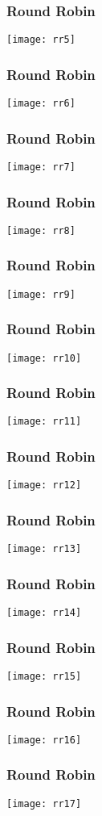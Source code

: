 \begin{frame}
\frametitle{Round Robin}
\texttt{[image: rr5]}
\end{frame}

\begin{frame}
\frametitle{Round Robin}
\texttt{[image: rr6]}
\end{frame}

\begin{frame}
\frametitle{Round Robin}
\texttt{[image: rr7]}
\end{frame}

\begin{frame}
\frametitle{Round Robin}
\texttt{[image: rr8]}
\end{frame}

\begin{frame}
\frametitle{Round Robin}
\texttt{[image: rr9]}
\end{frame}

\begin{frame}
\frametitle{Round Robin}
\texttt{[image: rr10]}
\end{frame}

\begin{frame}
\frametitle{Round Robin}
\texttt{[image: rr11]}
\end{frame}

\begin{frame}
\frametitle{Round Robin}
\texttt{[image: rr12]}
\end{frame}

\begin{frame}
\frametitle{Round Robin}
\texttt{[image: rr13]}
\end{frame}

\begin{frame}
\frametitle{Round Robin}
\texttt{[image: rr14]}
\end{frame}

\begin{frame}
\frametitle{Round Robin}
\texttt{[image: rr15]}
\end{frame}

\begin{frame}
\frametitle{Round Robin}
\texttt{[image: rr16]}
\end{frame}

\begin{frame}
\frametitle{Round Robin}
\texttt{[image: rr17]}
\end{frame}

